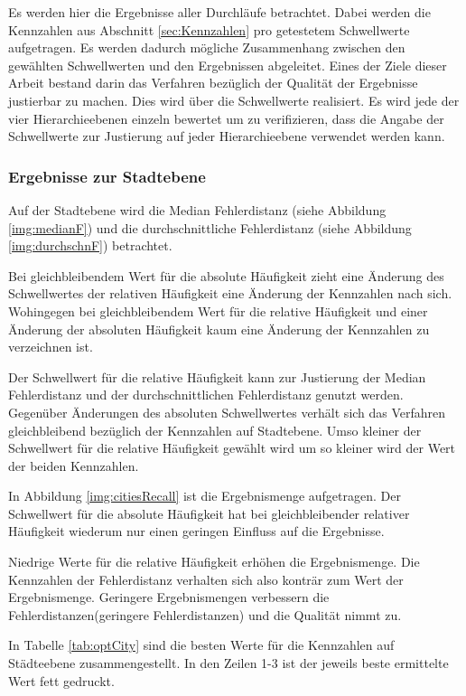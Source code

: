 			Es werden hier die Ergebnisse aller Durchläufe betrachtet.
			Dabei werden die Kennzahlen aus Abschnitt \ref{sec:Kennzahlen} pro getestetem Schwellwerte aufgetragen. 
			Es werden dadurch mögliche Zusammenhang zwischen den gewählten Schwellwerten und den Ergebnissen abgeleitet.
			Eines der Ziele dieser Arbeit bestand darin das Verfahren bezüglich der Qualität der Ergebnisse justierbar zu machen.
			Dies wird über die Schwellwerte realisiert.
			Es wird jede der vier Hierarchieebenen einzeln bewertet um zu verifizieren, dass die Angabe der Schwellwerte zur Justierung auf jeder Hierarchieebene verwendet werden kann.

			\subsubsection{Ergebnisse zur Stadtebene}

				Auf der Stadtebene wird die Median Fehlerdistanz (siehe Abbildung \ref{img:medianF}) und die durchschnittliche Fehlerdistanz (siehe Abbildung \ref{img:durchschnF}) betrachtet.

				Bei gleichbleibendem Wert für die absolute Häufigkeit zieht eine Änderung des Schwellwertes der relativen Häufigkeit eine Änderung der Kennzahlen nach sich. 
				Wohingegen bei gleichbleibendem Wert für die relative Häufigkeit und einer Änderung der absoluten Häufigkeit kaum eine Änderung der Kennzahlen zu verzeichnen ist.

				Der Schwellwert für die relative Häufigkeit kann zur Justierung der Median Fehlerdistanz und der durchschnittlichen Fehlerdistanz genutzt werden.
				Gegenüber Änderungen des absoluten Schwellwertes verhält sich das Verfahren gleichbleibend bezüglich der Kennzahlen auf Stadtebene.
				Umso kleiner der Schwellwert für die relative Häufigkeit gewählt wird um so kleiner wird der Wert der beiden Kennzahlen.

				In Abbildung \ref{img:citiesRecall} ist die Ergebnismenge aufgetragen.
				Der Schwellwert für die absolute Häufigkeit hat bei gleichbleibender relativer Häufigkeit wiederum nur einen geringen Einfluss auf die Ergebnisse. 

				Niedrige Werte für die relative Häufigkeit erhöhen die Ergebnismenge.
				Die Kennzahlen der Fehlerdistanz verhalten sich also konträr zum Wert der Ergebnismenge.
				Geringere Ergebnismengen verbessern die Fehlerdistanzen(geringere Fehlerdistanzen) und die Qualität nimmt zu.		

				In Tabelle \ref{tab:optCity} sind die besten Werte für die Kennzahlen auf Städteebene zusammengestellt. 
				In den Zeilen 1-3 ist der jeweils beste ermittelte Wert fett gedruckt.
				
